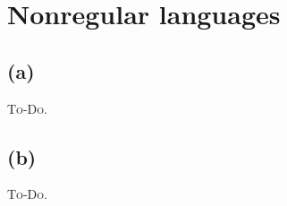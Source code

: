 


\setcounter{section}{2}

\section{Nonregular languages}

\subsection{(a)}

\textsc{To-Do.}

\subsection{(b)}

\textsc{To-Do.}


